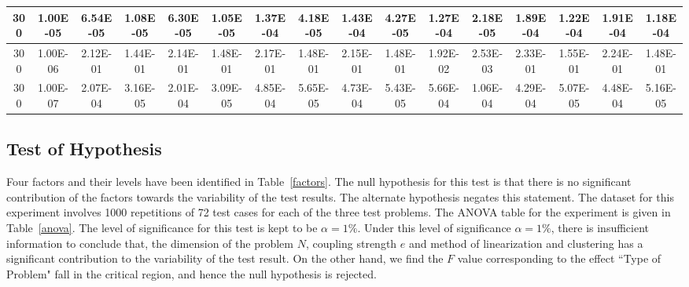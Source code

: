 \begin{table}[H]
\begin{center}
{\begin{tabular}{|c|c|c|c|c|c|c|c|c|c|c|c|c|c|c|c|}
300    &    1.00E-05    &    6.54E-05    &    1.08E-05    &    6.30E-05    &    1.05E-05    &    1.37E-04    &    4.18E-05    &    1.43E-04    &    4.27E-05    &    1.27E-04    &    2.18E-05    &    1.89E-04    &    1.22E-04    &    1.91E-04    &    1.18E-04    \\ \hline
300    &    1.00E-06    &    2.12E-01    &    1.44E-01    &    2.14E-01    &    1.48E-01    &    2.17E-01    &    1.48E-01    &    2.15E-01    &    1.48E-01    &    1.92E-02    &    2.53E-03    &    2.33E-01    &    1.55E-01    &    2.24E-01    &    1.48E-01    \\ \hline
300    &    1.00E-07    &    2.07E-04    &    3.16E-05    &    2.01E-04    &    3.09E-05    &    4.85E-04    &    5.65E-05    &    4.73E-04    &    5.43E-05    &    5.66E-04    &    1.06E-04    &    4.29E-04    &    5.07E-05    &    4.48E-04    &    5.16E-05    \\ \hline                    
\end{tabular} 
}
\end{center}
\end{table}

\subsection{Test of Hypothesis}
\label{hypothesis}
Four factors and their levels have been identified in Table~\ref{factors}. The null hypothesis for this test is that there is no significant contribution of the factors towards the variability of the test results. The alternate hypothesis negates this statement. The dataset for this experiment involves 1000 repetitions of 72 test cases for each of the three test problems. The ANOVA table for the experiment is given in Table~\ref{anova}. The level of significance for this test is kept to be $\alpha = 1\%$. Under this level of significance $\alpha = 1\%$, there is insufficient information to conclude that, the dimension of the problem $N$, coupling strength $e$ and method of linearization and clustering has a significant contribution to the variability of the test result. On the other hand, we find the $F$ value corresponding to the effect ``Type of Problem" fall in the critical region, and hence the null hypothesis is rejected. 

